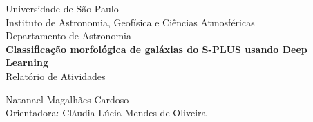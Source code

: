 \begin{titlepage}
  \begin{center}
    Universidade de São Paulo\\
    Instituto de Astronomia, Geofísica e Ciências Atmosféricas\\
    Departamento de Astronomia\\

    \vfill
    \large
    \textbf{Classificação morfológica de galáxias do S-PLUS usando Deep Learning}\\
    \vspace{.6cm}
    Relatório de Atividades

    \vfill
    Natanael Magalhães Cardoso\\
    {\normalsize Orientadora:} Cláudia Lúcia Mendes de Oliveira
    \vspace{2cm}
  \end{center}
\end{titlepage}